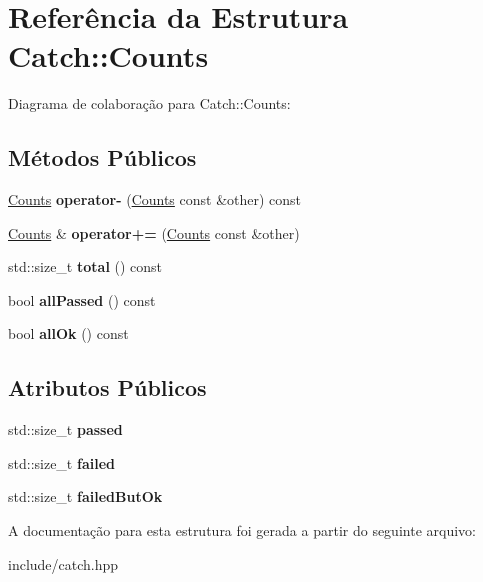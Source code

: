\hypertarget{structCatch_1_1Counts}{}\section{Referência da Estrutura Catch\+:\+:Counts}
\label{structCatch_1_1Counts}


Diagrama de colaboração para Catch\+:\+:Counts\+:
\subsection*{Métodos Públicos}
\begin{DoxyCompactItemize}
\item 
\hyperlink{structCatch_1_1Counts}{Counts} {\bfseries operator-\/} (\hyperlink{structCatch_1_1Counts}{Counts} const \&other) const \hypertarget{structCatch_1_1Counts_aedf86fefe33938d132a6981171cd83e6}{}\label{structCatch_1_1Counts_aedf86fefe33938d132a6981171cd83e6}

\item 
\hyperlink{structCatch_1_1Counts}{Counts} \& {\bfseries operator+=} (\hyperlink{structCatch_1_1Counts}{Counts} const \&other)\hypertarget{structCatch_1_1Counts_a322a89475cd2cc039140ef371e973677}{}\label{structCatch_1_1Counts_a322a89475cd2cc039140ef371e973677}

\item 
std\+::size\+\_\+t {\bfseries total} () const \hypertarget{structCatch_1_1Counts_a9125c662e30114e5c5cc94729b1e9e84}{}\label{structCatch_1_1Counts_a9125c662e30114e5c5cc94729b1e9e84}

\item 
bool {\bfseries all\+Passed} () const \hypertarget{structCatch_1_1Counts_adbbaca552f6017ce69e0d5dc5500bea4}{}\label{structCatch_1_1Counts_adbbaca552f6017ce69e0d5dc5500bea4}

\item 
bool {\bfseries all\+Ok} () const \hypertarget{structCatch_1_1Counts_ab2497c9dfc77be757a90225ea69595f5}{}\label{structCatch_1_1Counts_ab2497c9dfc77be757a90225ea69595f5}

\end{DoxyCompactItemize}
\subsection*{Atributos Públicos}
\begin{DoxyCompactItemize}
\item 
std\+::size\+\_\+t {\bfseries passed}\hypertarget{structCatch_1_1Counts_ad28daaf3de28006400208b6dd0c631e6}{}\label{structCatch_1_1Counts_ad28daaf3de28006400208b6dd0c631e6}

\item 
std\+::size\+\_\+t {\bfseries failed}\hypertarget{structCatch_1_1Counts_a19982a3817a3bc2c07f0290e71f497a3}{}\label{structCatch_1_1Counts_a19982a3817a3bc2c07f0290e71f497a3}

\item 
std\+::size\+\_\+t {\bfseries failed\+But\+Ok}\hypertarget{structCatch_1_1Counts_ac090973a2ff51394cd452718e75c073e}{}\label{structCatch_1_1Counts_ac090973a2ff51394cd452718e75c073e}

\end{DoxyCompactItemize}


A documentação para esta estrutura foi gerada a partir do seguinte arquivo\+:\begin{DoxyCompactItemize}
\item 
include/catch.\+hpp\end{DoxyCompactItemize}
